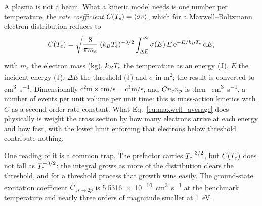 A plasma is not a beam. What a kinetic model needs is one number per
temperature, the \emph{rate coefficient} $C(T_e) = \langle\sigma v\rangle$,
which for a Maxwell--Boltzmann electron distribution reduces to
\begin{equation}
  C(T_e) = \sqrt{\frac{8}{\pi m_e}}\;(k_BT_e)^{-3/2}
           \int_{\Delta E}^{\infty}
           \sigma(E)\,E\,\mathrm{e}^{-E/k_BT_e}\,\mathrm{d}E,
  \label{eq:maxwell_average}
\end{equation}

\noindent with $m_e$ the electron mass (\si{\kilogram}), $k_BT_e$ the
temperature as an energy (\si{\joule}), $E$ the incident energy (\si{\joule}),
$\Delta E$ the threshold (\si{\joule}) and $\sigma$ in \si{\square\metre}; the
result is converted to \si{\cubic\centi\metre\per\second}. Dimensionally
$\si{\square\centi\metre}\times\si{\centi\metre\per\second} =
\si{\cubic\centi\metre\per\second}$, and $Cn_e n_p$ is then
\si{\per\cubic\centi\metre\per\second}, a number of events per unit volume per
unit time: this is mass-action kinetics with $C$ as a second-order rate
constant. What Eq.~\eqref{eq:maxwell_average} does physically is weight the
cross section by how many electrons arrive at each energy and how fast, with the
lower limit enforcing that electrons below threshold contribute nothing.

One reading of it is a common trap. The prefactor carries $T_e^{-3/2}$, but
$C(T_e)$ does not fall as $T_e^{-3/2}$: the integral grows as more of the
distribution clears the threshold, and for a threshold process that growth wins
easily. The ground-state excitation coefficient $C_{1s\to2p}$ is
\SI{5.5316e-10}{\cubic\centi\metre\per\second} at the benchmark temperature and
nearly three orders of magnitude smaller at \SI{1}{\electronvolt}.

